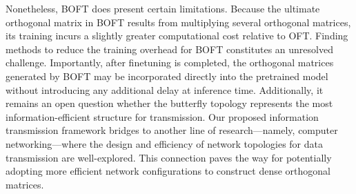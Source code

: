 Nonetheless, BOFT does present certain limitations. Because the ultimate orthogonal matrix in BOFT results from multiplying several orthogonal matrices, its training incurs a slightly greater computational cost relative to OFT. Finding methods to reduce the training overhead for BOFT constitutes an unresolved challenge. Importantly, after finetuning is completed, the orthogonal matrices generated by BOFT may be incorporated directly into the pretrained model without introducing any additional delay at inference time. Additionally, it remains an open question whether the butterfly topology represents the most information-efficient structure for transmission. Our proposed information transmission framework bridges to another line of research—namely, computer networking—where the design and efficiency of network topologies for data transmission are well-explored. This connection paves the way for potentially adopting more efficient network configurations to construct dense orthogonal matrices.